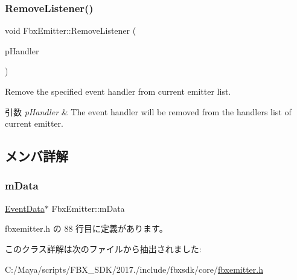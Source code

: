 \subsubsection{\texorpdfstring{Remove\+Listener()}{RemoveListener()}}
{\footnotesize\ttfamily void Fbx\+Emitter\+::\+Remove\+Listener (\begin{DoxyParamCaption}\item[{\hyperlink{class_fbx_event_handler}{Fbx\+Event\+Handler} \&}]{p\+Handler }\end{DoxyParamCaption})}

Remove the specified event handler from current emitter list. 
\begin{DoxyParams}{引数}
{\em p\+Handler} & The event handler will be removed from the handlers list of current emitter. \\
\hline
\end{DoxyParams}


\subsection{メンバ詳解}
\mbox{\label{class_fbx_emitter_ad2d8605b0a35c0fd4172ac0c55483582}} 
\subsubsection{\texorpdfstring{m\+Data}{mData}}
{\footnotesize\ttfamily \hyperlink{struct_fbx_emitter_1_1_event_data}{Event\+Data}$\ast$ Fbx\+Emitter\+::m\+Data\hspace{0.3cm}{\ttfamily [protected]}}



 fbxemitter.\+h の 88 行目に定義があります。



このクラス詳解は次のファイルから抽出されました\+:\begin{DoxyCompactItemize}
\item 
C\+:/\+Maya/scripts/\+F\+B\+X\+\_\+\+S\+D\+K/2017./include/fbxsdk/core/\hyperlink{fbxemitter_8h}{fbxemitter.\+h}\end{DoxyCompactItemize}
